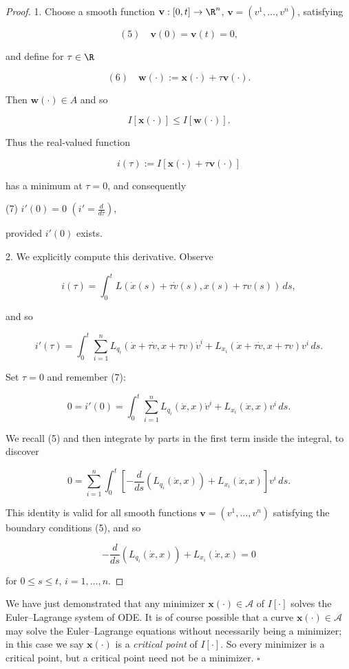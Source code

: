 \begin{proof}
1. Choose a smooth function $\mathbf{v} : [0,t] \to \R^n$, $\mathbf{v} = (v^1,\ldots,v^n)$, satisfying

$$(5) \quad \mathbf{v}(0) = \mathbf{v}(t) = 0,$$

and define for $\tau \in \R$

$$(6) \quad \mathbf{w}(\cdot) := \mathbf{x}(\cdot) + \tau \mathbf{v}(\cdot).$$

Then $\mathbf{w}(\cdot) \in A$ and so

$$I[\mathbf{x}(\cdot)] \leq I[\mathbf{w}(\cdot)].$$

Thus the real-valued function

$$i(\tau) := I[\mathbf{x}(\cdot) + \tau \mathbf{v}(\cdot)]$$

has a minimum at $\tau = 0$, and consequently

(7)                $i'(0) = 0$ $\left(i' = \frac{d}{d\tau}\right)$,

provided $i'(0)$ exists.

2. We explicitly compute this derivative. Observe

$$i(\tau) = \int_0^t L(\dot{x}(s) + \tau\dot{v}(s), x(s) + \tau v(s)) \, ds,$$

and so

$$i'(\tau) = \int_0^t \sum_{i=1}^n L_{q_i}(\dot{x} + \tau\dot{v}, x + \tau v)\dot{v}^i + L_{x_i}(\dot{x} + \tau\dot{v}, x + \tau v)v^i \, ds.$$

Set $\tau = 0$ and remember (7):

$$0 = i'(0) = \int_0^t \sum_{i=1}^n L_{q_i}(\dot{x}, x)\dot{v}^i + L_{x_i}(\dot{x}, x)v^i \, ds.$$

We recall (5) and then integrate by parts in the first term inside the integral, to discover

$$0 = \sum_{i=1}^n \int_0^t \left[-\frac{d}{ds}(L_{q_i}(\dot{x}, x)) + L_{x_i}(\dot{x}, x)\right] v^i \, ds.$$

This identity is valid for all smooth functions $\mathbf{v} = (v^1, \ldots, v^n)$ satisfying the boundary conditions (5), and so

$$-\frac{d}{ds}(L_{q_i}(\dot{x}, x)) + L_{x_i}(\dot{x}, x) = 0$$

for $0 \leq s \leq t$, $i = 1, \ldots, n$.
\end{proof}

\begin{remark}
\label{rem:critical-point-vs-minimizer}
We have just demonstrated that any minimizer $\mathbf{x}(\cdot) \in \mathcal{A}$ of $I[\cdot]$ solves the Euler--Lagrange system of ODE. It is of course possible that a curve $\mathbf{x}(\cdot) \in \mathcal{A}$ may solve the Euler--Lagrange equations without necessarily being a minimizer; in this case we say $\mathbf{x}(\cdot)$ is a \textit{critical point} of $I[\cdot]$. So every minimizer is a critical point, but a critical point need not be a minimizer. $\square$
\end{remark}

